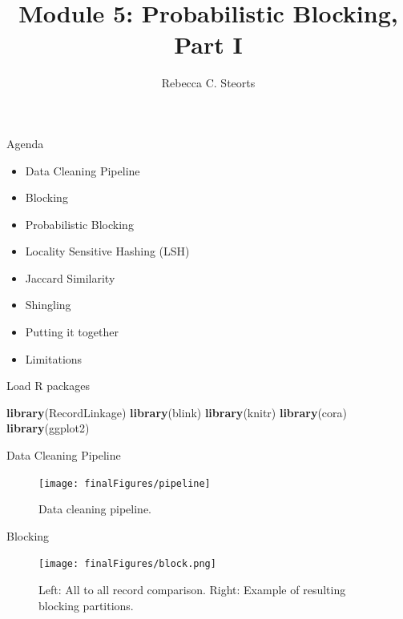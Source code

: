 \documentclass[
  ignorenonframetext,
]{beamer}
\title{Module 5: Probabilistic Blocking, Part I}
\author{Rebecca C. Steorts}
\date{}
\newenvironment{Shaded}{\begin{snugshade}}{\end{snugshade}}
\newcommand{\KeywordTok}[1]{\textcolor[rgb]{0.13,0.29,0.53}{\textbf{#1}}}
\newcommand{\NormalTok}[1]{#1}
\providecommand{\tightlist}{%
  \setlength{\itemsep}{0pt}\setlength{\parskip}{0pt}}
\begin{document}
\frame{\titlepage}

\begin{frame}{Agenda}
\protect\hypertarget{agenda}{}

\begin{itemize}
\tightlist
\item
  Data Cleaning Pipeline
\item
  Blocking
\item
  Probabilistic Blocking
\item
  Locality Sensitive Hashing (LSH)
\item
  Jaccard Similarity
\item
  Shingling
\item
  Putting it together
\item
  Limitations
\end{itemize}

\end{frame}

\begin{frame}[fragile]{Load R packages}
\protect\hypertarget{load-r-packages}{}

\begin{Shaded}
\begin{Highlighting}[]
\KeywordTok{library}\NormalTok{(RecordLinkage)}
\KeywordTok{library}\NormalTok{(blink)}
\KeywordTok{library}\NormalTok{(knitr)}
\KeywordTok{library}\NormalTok{(cora)}
\KeywordTok{library}\NormalTok{(ggplot2)}
\end{Highlighting}
\end{Shaded}

\end{frame}

\begin{frame}{Data Cleaning Pipeline}
\protect\hypertarget{data-cleaning-pipeline}{}

\begin{figure}
  \begin{center}
    \texttt{[image: finalFigures/pipeline]}
    \caption{Data cleaning pipeline.}
    \end{center}
\end{figure}

\end{frame}

\begin{frame}{Blocking}
\protect\hypertarget{blocking}{}

\begin{figure}
  \begin{center}
    \texttt{[image: finalFigures/block.png]}
    \caption{Left: All to all record comparison. Right: Example of resulting blocking partitions. }
    \end{center}
\end{figure}

\end{frame}
\end{document}
